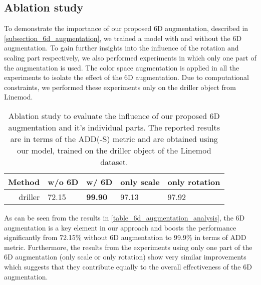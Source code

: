 \documentclass[twocolumn, 10pt, letterpaper]{article}
\begin{document}
\subsection{Ablation study}
\label{subsection_ablation_study}
To demonstrate the importance of our proposed 6D augmentation, described in \autoref{subsection_6d_augmentation}, we trained a  model with and without the 6D augmentation. To gain further insights into the influence of the rotation and scaling part respectively, we also performed experiments in which only one part of the augmentation is used. The color space augmentation is applied in all the experiments to isolate the effect of the 6D augmentation. Due to computational constraints, we performed these experiments only on the driller object from Linemod.\\
\begin{table}
\begin{tabularx}{\columnwidth}{ | r | X  X  X  X |}
 \hline
 Method & w/o 6D & w/ 6D & only scale & only rotation \\
 \hline
 driller & 72.15 & \textbf{99.90} & 97.13 & 97.92 \\
 \hline
\end{tabularx}
\caption{Ablation study to evaluate the influence of our proposed 6D augmentation and it's individual parts. The reported results are in terms of the ADD(-S) metric and are obtained using our  model, trained on the driller object of the Linemod dataset.}
\label{table_6d_augmentation_analysis}
\end{table}
 As can be seen from the results in \autoref{table_6d_augmentation_analysis}, the 6D augmentation is a key element in our approach and boosts the performance significantly from 72.15\% without 6D augmentation to 99.9\% in terms of ADD metric. Furthermore, the results from the experiments using only one part of the 6D augmentation (only scale or only rotation) show very similar improvements which suggests that they contribute equally to the overall effectiveness of the 6D augmentation.
\end{document}
